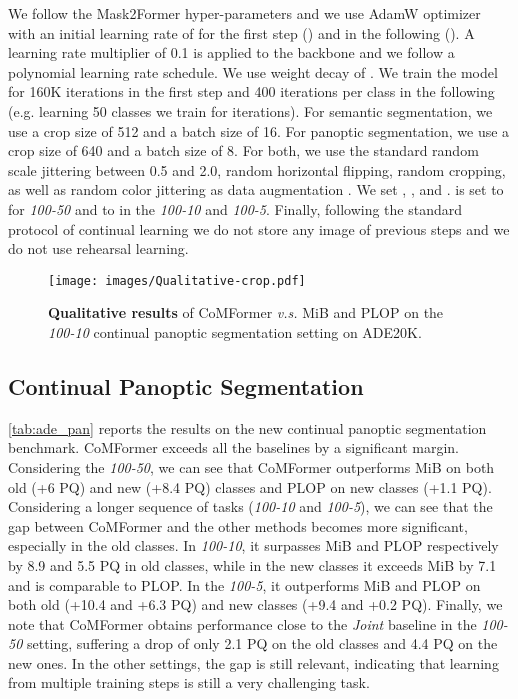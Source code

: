 \documentclass[10pt,twocolumn,letterpaper]{article}
\begin{document}
We follow the Mask2Former \cite{cheng2021masked} hyper-parameters and we use AdamW \cite{ilya2019decoupled} optimizer with an initial learning rate of  for the first step () and  in the following (). A learning rate multiplier of 0.1 is applied to the backbone and we follow a polynomial learning rate schedule. We use weight decay of . We train the model for 160K iterations in the first step and 400 iterations per class in the following (e.g. learning 50 classes we train for  iterations).
For semantic segmentation, we use a crop size of 512 and a batch size of 16. For panoptic segmentation, we use a crop size of 640 and a batch size of 8. For both, we use the standard random scale jittering between 0.5 and 2.0, random horizontal flipping, random cropping, as well as random color jittering as data augmentation \cite{cheng2021maskformer}. We set , , and .  is set to  for \textit{100-50} and to  in the \textit{100-10} and \textit{100-5}.
Finally, following the standard protocol of continual learning \cite{cermelli2020modelingthebackground, douillard2020plop} we do not store any image of previous steps and we do not use rehearsal learning.

\begin{figure*}
    \texttt{[image: images/Qualitative-crop.pdf]}
    \caption{\textbf{Qualitative results} of CoMFormer \textit{v.s.} MiB and PLOP on the \textit{100-10} continual panoptic segmentation setting on ADE20K.}
    \label{fig:qualitative_results} \vspace{-1em}
\end{figure*}

\subsection{Continual Panoptic Segmentation}
\cref{tab:ade_pan} reports the results on the new continual panoptic segmentation benchmark. CoMFormer exceeds all the baselines by a significant margin. Considering the \textit{100-50}, we can see that CoMFormer outperforms MiB on both old (+6 PQ) and new (+8.4 PQ) classes and PLOP on new classes (+1.1 PQ). Considering a longer sequence of tasks (\textit{100-10} and \textit{100-5}), we can see that the gap between CoMFormer and the other methods becomes more significant, especially in the old classes. In \textit{100-10}, it surpasses MiB and PLOP respectively by 8.9 and 5.5 PQ in old classes, while in the new classes it exceeds MiB by 7.1 and is comparable to PLOP. In the \textit{100-5}, it outperforms MiB and PLOP on both old (+10.4 and +6.3 PQ) and new classes (+9.4 and +0.2 PQ). Finally, we note that CoMFormer obtains performance close to the \textit{Joint} baseline in the \textit{100-50} setting, suffering a drop of only 2.1 PQ on the old classes and 4.4 PQ on the new ones. In the other settings, the gap is still relevant, indicating that learning from multiple training steps is still a very challenging task. 
\end{document}
